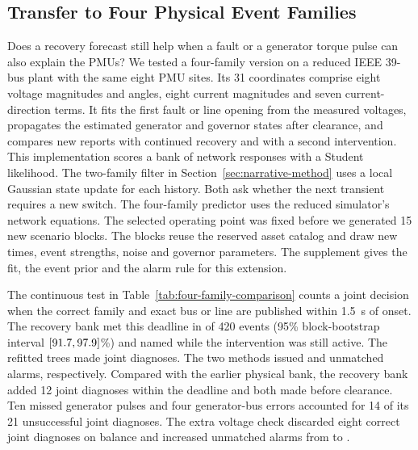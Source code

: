 \subsection{Transfer to Four Physical Event Families}
\label{sec:four-family-comparison}

Does a recovery forecast still help when a fault or a generator torque
pulse can also explain the PMUs? We tested a four-family version on
a reduced IEEE 39-bus plant with the same eight PMU sites. Its 31
coordinates comprise eight voltage magnitudes and angles, eight
current magnitudes and seven current-direction terms. It fits the
first fault or line opening from the measured voltages, propagates the
estimated generator and governor states after clearance, and compares
new reports with continued recovery and with a second intervention.
This implementation scores a bank of network responses with a Student
likelihood. The two-family filter in Section~\ref{sec:narrative-method}
uses a local Gaussian state update for each history. Both ask whether the
next transient requires a new switch. The four-family predictor uses
the reduced simulator's network equations. The selected
operating point was fixed before we generated 15 new scenario blocks.
The blocks reuse the reserved asset catalog and draw new times, event
strengths, noise and governor parameters. The supplement gives the fit,
the event prior and the alarm rule for this extension.



The continuous test in Table~\ref{tab:four-family-comparison} counts a
joint decision when the correct family and exact bus or line are
published within 1.5~s of onset. The recovery bank met this deadline in
\RepBankJoint{} of 420 events (95\% block-bootstrap interval
$[91.7, 97.9]$\%) and named \RepBankActive{} while the intervention
was still active. The refitted trees made \RepTreeJoint{}
joint diagnoses. The two methods issued \RepBankExtras{} and
\RepTreeExtras{} unmatched alarms, respectively. Compared with the earlier
physical bank, the recovery bank added 12 joint diagnoses within the
deadline and both made \RepBankActive{} before clearance. Ten missed
generator pulses and four generator-bus errors accounted for 14 of its
21 unsuccessful joint diagnoses. The extra voltage check discarded
eight correct joint diagnoses on balance and increased unmatched alarms
from \RepBankExtras{} to \RepCheckExtras{}.

